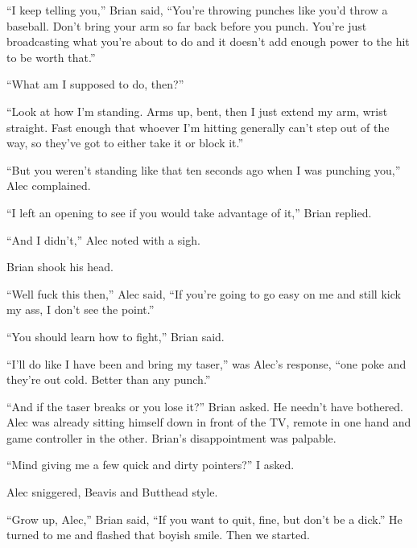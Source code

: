 ``I keep telling you,'' Brian said, ``You're throwing punches like you'd throw a baseball.  Don't bring your arm so far back before you punch.  You're just broadcasting what you're about to do and it doesn't add enough power to the hit to be worth that.''



``What am I supposed to do, then?''



``Look at how I'm standing.  Arms up, bent, then I just extend my arm, wrist straight.  Fast enough that whoever I'm hitting generally can't step out of the way, so they've got to either take it or block it.''



``But you weren't standing like that ten seconds ago when I was punching you,'' Alec complained.



``I left an opening to see if you would take advantage of it,'' Brian replied.



``And I didn't,'' Alec noted with a sigh.



Brian shook his head.



``Well fuck this then,'' Alec said, ``If you're going to go easy on me and still kick my ass, I don't see the point.''



``You should learn how to fight,'' Brian said.



``I'll do like I have been and bring my taser,'' was Alec's response, ``one poke and they're out cold.  Better than any punch.''



``And if the taser breaks or you lose it?'' Brian asked.  He needn't have bothered.  Alec was already sitting himself down in front of the TV, remote in one hand and game controller in the other.  Brian's disappointment was palpable.



``Mind giving me a few quick and dirty pointers?'' I asked.



Alec sniggered, Beavis and Butthead style.



``Grow up, Alec,'' Brian said, ``If you want to quit, fine, but don't be a dick.''  He turned to me and flashed that boyish smile.  Then we started.



